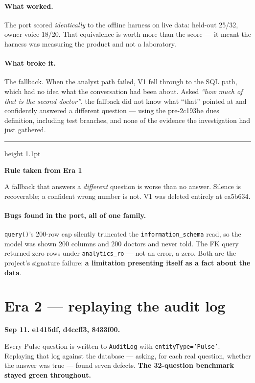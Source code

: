 \documentclass[11pt,a4paper]{report}
\newcommand{\code}[1]{\texttt{\small #1}}
\newcommand{\sha}[1]{{\ttfamily\small\color{slate}#1}}
\newenvironment{keybox}[1]
 {\par\medskip\begin{center}\begin{minipage}{0.94\textwidth}%
  {\color{navy}\hrule height 1.1pt}\vspace{5pt}\par
  \textbf{\color{navy}#1}\par\vspace{3pt}\small}
 {\par\vspace{5pt}{\color{mist}\hrule height 0.8pt}\end{minipage}\end{center}\medskip}
\begin{document}
\paragraph{What worked.} The port scored \emph{identically} to the offline harness on live data:
held-out 25/32, owner voice 18/20. That equivalence is worth more than the score --- it meant the
harness was measuring the product and not a laboratory.

\paragraph{What broke it.} The fallback. When the analyst path failed, V1 fell through to the SQL
path, which had no idea what the conversation had been about. Asked \emph{``how much of that is the
second doctor''}, the fallback did not know what ``that'' pointed at and confidently answered a
different question --- using the pre-\sha{2c193be} dues definition, including test branches, and
none of the evidence the investigation had just gathered.

\begin{keybox}{Rule taken from Era 1}
A fallback that answers a \emph{different} question is worse than no answer. Silence is
recoverable; a confident wrong number is not. V1 was deleted entirely at \sha{ea5b634}.
\end{keybox}

\paragraph{Bugs found in the port, all of one family.} \code{query()}'s 200-row cap silently
truncated the \code{information\_schema} read, so the model was shown 200 columns and 200 doctors
and never told. The FK query returned zero rows under \code{analytics\_ro} --- not an error, a
zero. Both are the project's signature failure: \textbf{a limitation presenting itself as a fact
about the data}.

\section{Era 2 --- replaying the audit log}
\label{sec:era2}

\textbf{Sep 11. \sha{e1415df}, \sha{d4ccff3}, \sha{8433f00}.}

Every Pulse question is written to \code{AuditLog} with \code{entityType='Pulse'}. Replaying that
log against the database --- asking, for each real question, whether the answer was true ---
found seven defects. \textbf{The 32-question benchmark stayed green throughout.}
\end{document}

